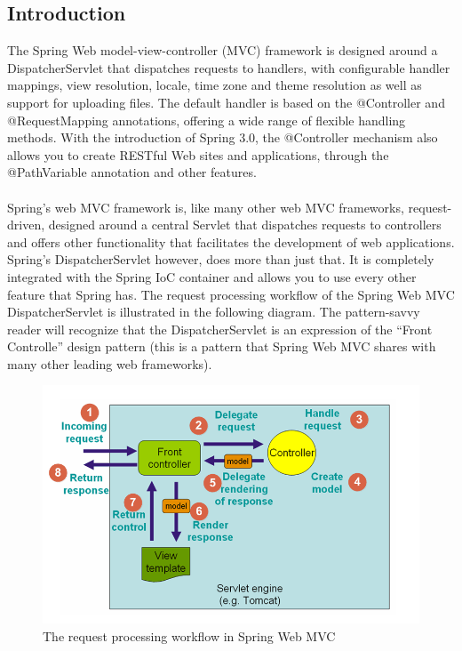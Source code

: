 \documentclass[12pt]{article}
\begin{document}
\subsection{Introduction}
The Spring Web model-view-controller (MVC) framework is designed around a \colorbox{mygray}{DispatcherServlet} that dispatches requests to handlers, with configurable handler mappings, view resolution, locale, time zone and theme resolution as well as support for uploading files. The default handler is based on the \colorbox{mygray}{@Controller} and \colorbox{mygray}{@RequestMapping} annotations, offering a wide range of flexible handling methods. With the introduction of Spring 3.0, the \colorbox{mygray}{@Controller} mechanism also allows you to create RESTful Web sites and applications, through the \colorbox{mygray}{@PathVariable} annotation and other features.
 \\
\\
Spring’s web MVC framework is, like many other web MVC frameworks, request-driven, designed around a central Servlet that dispatches requests to controllers and offers other functionality that facilitates the development of web applications. Spring’s DispatcherServlet however, does more than just that. It is completely integrated with the Spring IoC container and allows you to use every other feature that Spring has.
\newpage
The request processing workflow of the Spring Web MVC DispatcherServlet is illustrated in the following diagram. The pattern-savvy reader will recognize that the DispatcherServlet is an expression of the ``Front Controlle'' design pattern (this is a pattern that Spring Web MVC shares with many other leading web frameworks).
\begin{figure}[h]
	\centering
	\includegraphics[width=1.1\textwidth]{workflow_spring_mvc.png}
	\caption{The request processing workflow in Spring Web MVC}
\end{figure}
\end{document}

